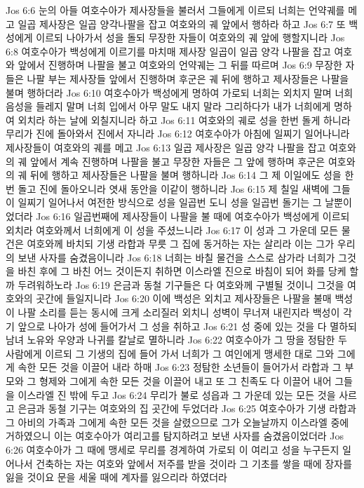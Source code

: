 Jos 6:6  눈의 아들 여호수아가 제사장들을 불러서 그들에게 이르되 너희는 언약궤를 메고 일곱 제사장은 일곱 양각나팔을 잡고 여호와의 궤 앞에서 행하라 하고
Jos 6:7  또 백성에게 이르되 나아가서 성을 돌되 무장한 자들이 여호와의 궤 앞에 행할지니라
Jos 6:8  여호수아가 백성에게 이르기를 마치매 제사장 일곱이 일곱 양각 나팔을 잡고 여호와 앞에서 진행하며 나팔을 불고 여호와의 언약궤는 그 뒤를 따르며
Jos 6:9  무장한 자들은 나팔 부는 제사장들 앞에서 진행하며 후군은 궤 뒤에 행하고 제사장들은 나팔을 불며 행하더라
Jos 6:10  여호수아가 백성에게 명하여 가로되 너희는 외치지 말며 너희 음성을 들레지 말며 너희 입에서 아무 말도 내지 말라 그리하다가 내가 너희에게 명하여 외치라 하는 날에 외칠지니라 하고
Jos 6:11  여호와의 궤로 성을 한번 돌게 하니라 무리가 진에 돌아와서 진에서 자니라
Jos 6:12  여호수아가 아침에 일찌기 일어나니라 제사장들이 여호와의 궤를 메고
Jos 6:13  일곱 제사장은 일곱 양각 나팔을 잡고 여호와의 궤 앞에서 계속 진행하며 나팔을 불고 무장한 자들은 그 앞에 행하며 후군은 여호와의 궤 뒤에 행하고 제사장들은 나팔을 불며 행하니라
Jos 6:14  그 제 이일에도 성을 한번 돌고 진에 돌아오니라 엿새 동안을 이같이 행하니라
Jos 6:15  제 칠일 새벽에 그들이 일찌기 일어나서 여전한 방식으로 성을 일곱번 도니 성을 일곱번 돌기는 그 날뿐이었더라
Jos 6:16  일곱번째에 제사장들이 나팔을 불 때에 여호수아가 백성에게 이르되 외치라 여호와께서 너희에게 이 성을 주셨느니라
Jos 6:17  이 성과 그 가운데 모든 물건은 여호와께 바치되 기생 라합과 무릇 그 집에 동거하는 자는 살리라 이는 그가 우리의 보낸 사자를 숨겼음이니라
Jos 6:18  너희는 바칠 물건을 스스로 삼가라 너희가 그것을 바친 후에 그 바친 어느 것이든지 취하면 이스라엘 진으로 바침이 되어 화를 당케 할까 두려워하노라
Jos 6:19  은금과 동철 기구들은 다 여호와께 구별될 것이니 그것을 여호와의 곳간에 들일지니라
Jos 6:20  이에 백성은 외치고 제사장들은 나팔을 불매 백성이 나팔 소리를 듣는 동시에 크게 소리질러 외치니 성벽이 무너져 내린지라 백성이 각기 앞으로 나아가 성에 들어가서 그 성을 취하고
Jos 6:21  성 중에 있는 것을 다 멸하되 남녀 노유와 우양과 나귀를 칼날로 멸하니라
Jos 6:22  여호수아가 그 땅을 정탐한 두 사람에게 이르되 그 기생의 집에 들어 가서 너희가 그 여인에게 맹세한 대로 그와 그에게 속한 모든 것을 이끌어 내라 하매
Jos 6:23  정탐한 소년들이 들어가서 라합과 그 부모와 그 형제와 그에게 속한 모든 것을 이끌어 내고 또 그 친족도 다 이끌어 내어 그들을 이스라엘 진 밖에 두고
Jos 6:24  무리가 불로 성읍과 그 가운데 있는 모든 것을 사르고 은금과 동철 기구는 여호와의 집 곳간에 두었더라
Jos 6:25  여호수아가 기생 라합과 그 아비의 가족과 그에게 속한 모든 것을 살렸으므로 그가 오늘날까지 이스라엘 중에 거하였으니 이는 여호수아가 여리고를 탐지하려고 보낸 사자를 숨겼음이었더라
Jos 6:26  여호수아가 그 때에 맹세로 무리를 경계하여 가로되 이 여리고 성을 누구든지 일어나서 건축하는 자는 여호와 앞에서 저주를 받을 것이라 그 기초를 쌓을 때에 장자를 잃을 것이요 문을 세울 때에 계자를 잃으리라 하였더라
